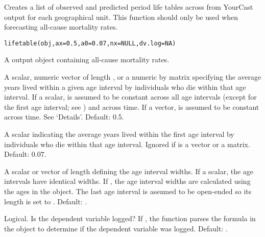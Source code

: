 %
\begin{Description}\relax
Creates a list of observed and predicted period life tables across from YourCast output for each geographical unit. This function should only be used when forecasting all-cause mortality rates.
\end{Description}
%
\begin{Usage}
\begin{verbatim}
lifetable(obj,ax=0.5,a0=0.07,nx=NULL,dv.log=NA)
\end{verbatim}
\end{Usage}
%
\begin{Arguments}
\begin{ldescription}

\item[\code{obj}] A  output object containing all-cause mortality rates.

\item[\code{ax}] A scalar, numeric vector of length , or a numeric  by  matrix specifying the average years lived within a given age interval \eqn{[x,x+n)}{} by individuals who die within that age interval. If a scalar,  is assumed to be constant across all age intervals (except for the first age interval; see ) and across time. If a vector,  is assumed to be constant across time. See `Details'. Default: 0.5.

\item[\code{a0}] A scalar indicating the average years lived within the first age interval by individuals who die within that age interval. Ignored if  is a vector or a matrix. Default: 0.07.

\item[\code{nx}] A scalar or vector of length  defining the age interval widths. If a scalar, the age intervals have identical widths. If , the age interval widths are calculated using the ages in the  object. The last age interval is assumed to be open-ended so its length is set to . Default: .

\item[\code{dv.log}] Logical. Is the dependent variable logged? If , the function parses the formula in the  object to determine if the dependent variable was logged. Default: .

\end{ldescription}
\end{Arguments}
